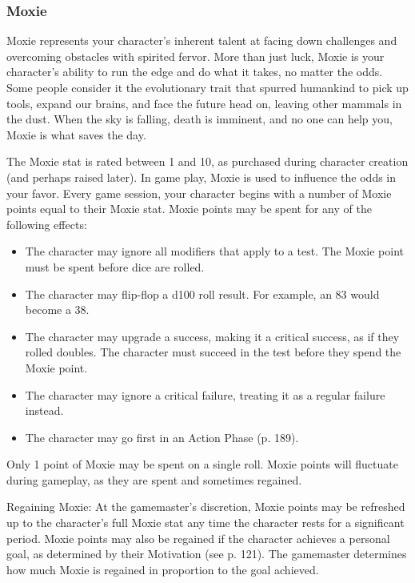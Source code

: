 \subsubsection{Moxie} \label{sec:moxie} 

Moxie represents your character's inherent talent at facing down challenges and overcoming obstacles with spirited fervor. More than just luck, Moxie is your character's ability to run the edge and do what it takes, no matter the odds. Some people consider it the evolutionary trait that spurred humankind to pick up tools, expand our brains, and face the future head on, leaving other mammals in the dust. When the sky is falling, death is imminent, and no one can help you, Moxie is what saves the day. 

The Moxie stat is rated between 1 and 10, as purchased during character creation (and perhaps raised later). In game play, Moxie is used to influence the odds in your favor. Every game session, your character begins with a number of Moxie points equal to their Moxie stat. Moxie points may be spent for any of the following effects: 

\begin{itemize} \item The character may ignore all modifiers that apply to a test. The Moxie point must be spent before dice are rolled. \item The character may flip-flop a d100 roll result. For example, an 83 would become a 38. \item The character may upgrade a success, making it a critical success, as if they rolled doubles. The character must succeed in the test before they spend the Moxie point. \item The character may ignore a critical failure, treating it as a regular failure instead. \item The character may go first in an Action Phase (p. 189). \end{itemize} 

Only 1 point of Moxie may be spent on a single roll. Moxie points will fluctuate during gameplay, as they are spent and sometimes regained. 

Regaining Moxie: At the gamemaster's discretion, Moxie points may be refreshed up to the character's full Moxie stat any time the character rests for a significant period. Moxie points may also be regained if the character achieves a personal goal, as determined by their Motivation (see p. 121). The gamemaster determines how much Moxie is regained in proportion to the goal achieved. 

